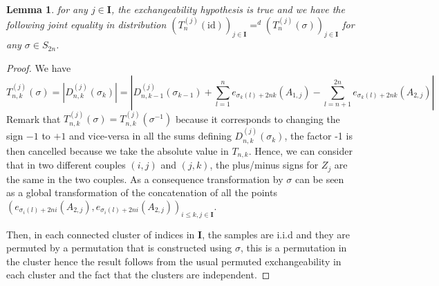 \documentclass{article}
\theoremstyle{plain}
\newtheorem{Lemma}{Lemma}
\theoremstyle{remark}
\newcommand{\1}{\mathbbm{1}}
\newcommand{\id}{\mathrm{id}}
\numberwithin{equation}{section}
\begin{document}
\begin{Lemma}
for any $j \in \textbf{I}$, the exchangeability hypothesis is true and we have the following joint equality in distribution $(T_n^{(j)}(\id))_{j \in\textbf{I}} =^d (T_n^{(j)}(\sigma))_{j \in \textbf{I}}$ for any $\sigma \in S_{2n}$.

\end{Lemma}
\begin{proof}
We have
$$T_{n,k}^{(j)}(\sigma)=|D_{n,k}^{(j)}(\sigma_{k})|= \left|D_{n,k-1}^{(j)}(\sigma_{k-1})+\sum_{l=1}^{n} e_{\sigma_k(l)+2nk}(A_{1,j})-\sum_{l=n+1}^{2n} e_{\sigma_k(l)+2nk}(A_{2,j}) \right| $$
Remark that $T_{n,k}^{(j)}(\sigma) = T_{n,k}^{(j)}(\sigma^{-1})$ because it corresponds to changing the sign $-1$
 to $+1$ and vice-versa in all the sums defining $D_{n,k}^{(j)}(\sigma_{k})$, the factor -1 is then cancelled because we take the absolute value in $T_{n,k}$. Hence, we can consider that in two different couples $(i,j)$ and $(j,k)$, the plus/minus signs for $Z_j$ are the same in the two couples. As a consequence transformation by $\sigma$ can be seen as a global transformation of the concatenation of all the points $(e_{\sigma_i(l)+2ni}(A_{2,j}), e_{\sigma_i(l)+2ni}(A_{2,j}))_{i\le k,j\in \textbf{I}}$. 

Then, in each connected cluster of indices in $\textbf{I}$, the samples are i.i.d and they are permuted by a permutation that is constructed using $\sigma$, this is a permutation in the cluster hence the result follows from the usual permuted exchangeability in each cluster and the fact that the clusters are independent.
\end{proof}
\end{document}
